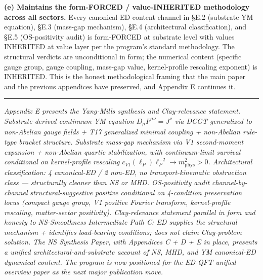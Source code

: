 \documentclass[
]{article}
\begin{document}
\textbf{(e) Maintains the form-FORCED / value-INHERITED methodology
across all sectors.} Every canonical-ED content channel in §E.2
(substrate YM equation), §E.3 (mass-gap mechanism), §E.4 (architectural
classification), and §E.5 (OS-positivity audit) is form-FORCED at
substrate level with values INHERITED at value layer per the program's
standard methodology. The structural verdicts are unconditional in form;
the numerical content (specific gauge group, gauge coupling, mass-gap
value, kernel-profile rescaling exponent) is INHERITED. This is the
honest methodological framing that the main paper and the previous
appendices have preserved, and Appendix E continues it.

\begin{center}\rule{0.5\linewidth}{0.5pt}\end{center}

\emph{Appendix E presents the Yang-Mills synthesis and Clay-relevance
statement. Substrate-derived continuum YM equation
\(D_\mu F^{\mu\nu} = J^\nu\) via DCGT generalized to non-Abelian gauge
fields + T17 generalized minimal coupling + non-Abelian rule-type
bracket structure. Substrate mass-gap mechanism via V1 second-moment
expansion + non-Abelian quartic stabilization, with continuum-limit
survival conditional on kernel-profile rescaling
\(c_{V1}(\ell_P)\ell_P^{-2} \to m_\mathrm{phys}^2 > 0\). Architectural
classification: 4 canonical-ED / 2 non-ED, no transport-kinematic
obstruction class --- structurally cleaner than NS or MHD. OS-positivity
audit channel-by-channel structural-suggestive positive conditional on
4-condition preservation locus (compact gauge group, V1 positive Fourier
transform, kernel-profile rescaling, matter-sector positivity).
Clay-relevance statement parallel in form and honesty to NS-Smoothness
Intermediate Path C: ED supplies the structural mechanism + identifies
load-bearing conditions; does not claim Clay-problem solution. The NS
Synthesis Paper, with Appendices C + D + E in place, presents a unified
architectural-and-substrate account of NS, MHD, and YM canonical-ED
dynamical content. The program is now positioned for the ED-QFT unified
overview paper as the next major publication move.}
\end{document}
